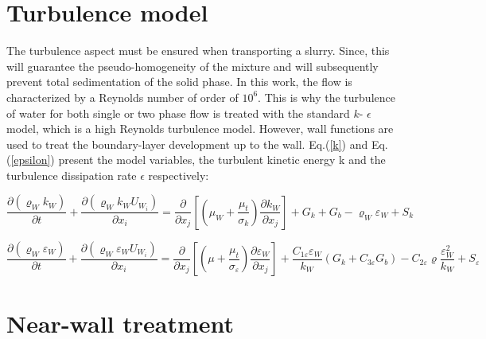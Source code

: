 \documentclass[11pt]{report}
\begin{document}
\section{Turbulence model}
%
The turbulence aspect must be ensured when transporting a slurry. 
%
Since, this will guarantee the pseudo-homogeneity of the mixture and will subsequently prevent total sedimentation of the solid phase. 
%
In this work, the flow is characterized by a Reynolds number of order of $10^6$. This is why the turbulence of water for both single or two phase flow is treated with the standard $k$- $\epsilon$ model, which is a high Reynolds turbulence model. 
%
However, wall functions are used to treat the boundary-layer development up to the wall. Eq.(\ref{k}) and Eq.(\ref{epsilon}) present the model variables, the turbulent kinetic energy k and the turbulence dissipation rate $\epsilon$ respectively:

\begin{equation}
\frac{\partial(\varrho_W k_W)}{\partial t}+\frac{\partial\left(\varrho_W k_W U_{W_i}\right)}{\partial x_{i}}=\frac{\partial}{\partial x_{j}}\left[\left(\mu_W+\frac{\mu_{t}}{\sigma_{k}}\right) \frac{\partial k_W}{\partial x_{j}}\right]+G_{k}+G_{b}-\varrho_W \varepsilon_W+S_{k}
\label{k}
\end{equation}

\begin{equation}
\frac{\partial(\varrho_W \varepsilon_W)}{\partial t}+\frac{\partial\left(\varrho_W \varepsilon_W U_{W_i}\right)}{\partial x_{i}}=\frac{\partial}{\partial x_{j}}\left[\left(\mu+\frac{\mu_{t}}{\sigma_{\varepsilon}}\right) \frac{\partial \varepsilon_W}{\partial x_{j}}\right]+\frac{C_{1 \varepsilon} \varepsilon_W}{k_W}\left(G_{k}+C_{3 \varepsilon} G_{b}\right)-C_{2 \varepsilon} \varrho \frac{\varepsilon_{W}^{2}}{k_W}+S_{\varepsilon}
\label{epsilon}
\end{equation}

\section{Near-wall treatment}\label{NWT}
\end{document}
